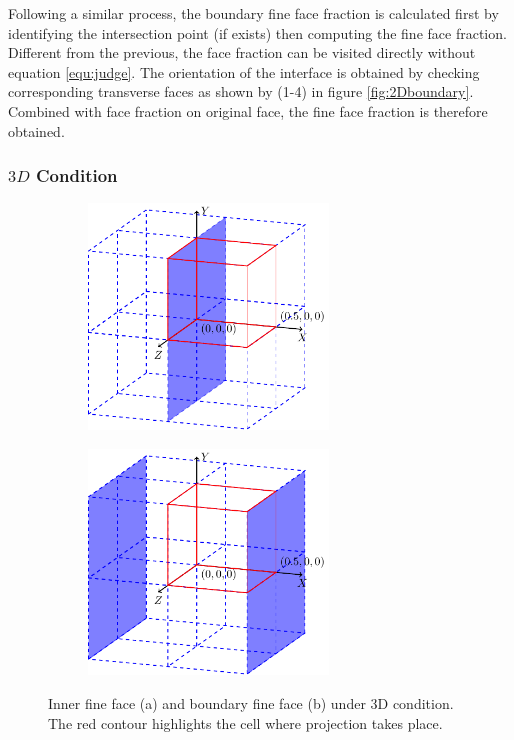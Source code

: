 \documentclass[a4paper]{article}
\begin{document}
Following a similar process, the boundary fine face fraction is calculated first by identifying the intersection point (if exists) then computing the fine face fraction. Different from the previous, the face fraction can be visited directly without equation \ref{equ:judge}. The orientation of the interface is obtained by checking corresponding transverse faces as shown by (1-4) in figure \ref{fig:2Dboundary}. Combined with face fraction on original face, the fine face fraction is therefore obtained.

\subsubsection{$3D$ Condition}
\begin{figure}[h]
    \centering
    \begin{subfigure}[b]{0.45\textwidth}
        \centering
        \includegraphics[height=6cm]{image/fs_3D3.pdf}
        \subcaption{}
        \label{fig:3Dinner}
    \end{subfigure}
    \begin{subfigure}[b]{0.45\textwidth}
        \centering
        \includegraphics[height=6cm]{image/fs_3D4.pdf}
        \subcaption{}
        \label{fig:3Dboundary}
    \end{subfigure}
    \caption{Inner fine face (a) and boundary fine face (b) under 3D condition. The red contour highlights the cell where projection takes place.}
    \label{fig:3Dface}
\end{figure}
\end{document}
